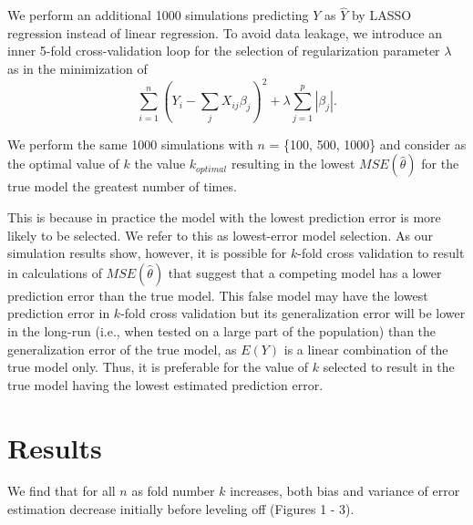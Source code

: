\documentclass[
  12pt,
]{article}
\begin{document}
We perform an additional 1000 simulations predicting \(Y\) as
\(\hat{Y}\) by LASSO regression instead of linear regression. To avoid
data leakage, we introduce an inner 5-fold cross-validation loop for the
selection of regularization parameter \(\lambda\) as in the minimization
of
\[\sum_{i=1}^{n}(Y_i - \sum_{j}X_{ij}\beta_j)^2 + \lambda\sum_{j=1}^{p}|\beta_j|.\]

We perform the same 1000 simulations with \(n\) = \{100, 500, 1000\} and
consider as the optimal value of \(k\) the value \(k_{optimal}\)
resulting in the lowest \(MSE(\hat{\theta})\) for the true model the
greatest number of times.

This is because in practice the model with the lowest prediction error
is more likely to be selected. We refer to this as lowest-error model
selection. As our simulation results show, however, it is possible for
\(k\)-fold cross validation to result in calculations of
\(MSE(\hat{\theta})\) that suggest that a competing model has a lower
prediction error than the true model. This false model may have the
lowest prediction error in \(k\)-fold cross validation but its
generalization error will be lower in the long-run (i.e., when tested on
a large part of the population) than the generalization error of the
true model, as \(E(Y)\) is a linear combination of the true model only.
Thus, it is preferable for the value of \(k\) selected to result in the
true model having the lowest estimated prediction error.

\hypertarget{results}{%
\section{Results}\label{results}}

We find that for all \(n\) as fold number \(k\) increases, both bias and
variance of error estimation decrease initially before leveling off
(Figures 1 - 3).
\end{document}
